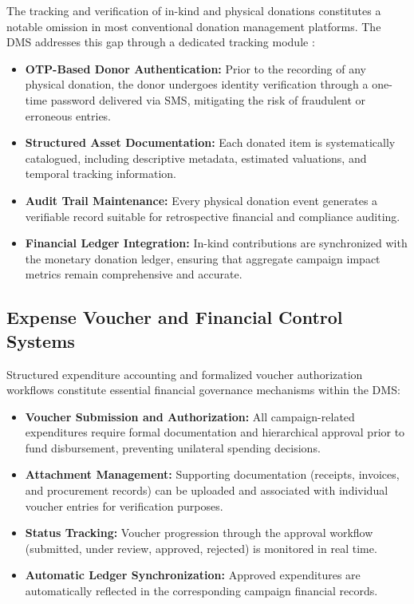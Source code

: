 \documentclass{thesis-library}
\begin{document}
The tracking and verification of in-kind and physical donations constitutes a notable omission in most conventional donation management platforms. The DMS addresses this gap through a dedicated tracking module \cite{kalinda2022university}:
\begin{itemize}
    \item \textbf{OTP-Based Donor Authentication:} Prior to the recording of any physical donation, the donor undergoes identity verification through a one-time password delivered via SMS, mitigating the risk of fraudulent or erroneous entries.
    \item \textbf{Structured Asset Documentation:} Each donated item is systematically catalogued, including descriptive metadata, estimated valuations, and temporal tracking information.
    \item \textbf{Audit Trail Maintenance:} Every physical donation event generates a verifiable record suitable for retrospective financial and compliance auditing.
    \item \textbf{Financial Ledger Integration:} In-kind contributions are synchronized with the monetary donation ledger, ensuring that aggregate campaign impact metrics remain comprehensive and accurate.
\end{itemize}

\subsection{Expense Voucher and Financial Control Systems}

Structured expenditure accounting and formalized voucher authorization workflows constitute essential financial governance mechanisms within the DMS:
\begin{itemize}
    \item \textbf{Voucher Submission and Authorization:} All campaign-related expenditures require formal documentation and hierarchical approval prior to fund disbursement, preventing unilateral spending decisions.
    \item \textbf{Attachment Management:} Supporting documentation (receipts, invoices, and procurement records) can be uploaded and associated with individual voucher entries for verification purposes.
    \item \textbf{Status Tracking:} Voucher progression through the approval workflow (submitted, under review, approved, rejected) is monitored in real time.
    \item \textbf{Automatic Ledger Synchronization:} Approved expenditures are automatically reflected in the corresponding campaign financial records.
\end{itemize}
\end{document}
